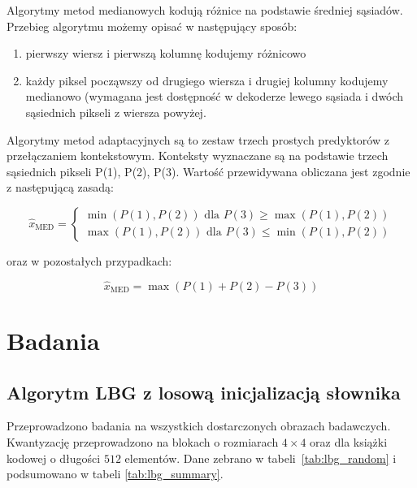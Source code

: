 \documentclass{article}
\begin{document}
Algorytmy metod medianowych kodują różnice na podstawie średniej sąsiadów. Przebieg algorytmu możemy opisać w następujący sposób:
\begin{enumerate}
 \item pierwszy wiersz i pierwszą kolumnę kodujemy różnicowo
 \item każdy piksel począwszy od drugiego wiersza i drugiej kolumny kodujemy medianowo (wymagana jest dostępność w dekoderze lewego sąsiada i dwóch sąsiednich pikseli z wiersza powyżej.\cite{differential_coding}
\end{enumerate}


Algorytmy metod adaptacyjnych są to zestaw trzech prostych predyktorów z przełączaniem kontekstowym. Konteksty wyznaczane są na podstawie trzech sąsiednich pikseli P(1), P(2), P(3). Wartość przewidywana obliczana jest zgodnie z następującą zasadą:


\begin{equation}
\hat{x}_{\mathrm{MED}}=\left\{\begin{array}{l}
\min (P(1), P(2)) \text{ dla } P(3) \geq \max(P(1), P(2)) \\
\max (P(1), P(2)) \text{ dla } P(3) \leq \min(P(1), P(2))
\end{array}\right.
\end{equation}

oraz w pozostałych przypadkach: 


\begin{equation}
\hat{x}_{\mathrm{MED}}= \max(P(1) + P(2) - P(3))
\end{equation}


\section{Badania}

\subsection{Algorytm LBG z losową inicjalizacją słownika}

Przeprowadzono badania na wszystkich dostarczonych obrazach badawczych. Kwantyzację przeprowadzono na blokach o rozmiarach $4 \times 4$ oraz dla książki
kodowej o długości $512$ elementów. Dane zebrano w \mbox{tabeli \ref{tab:lbg_random}} i podsumowano w tabeli \mbox{\ref{tab:lbg_summary}}.
\end{document}

